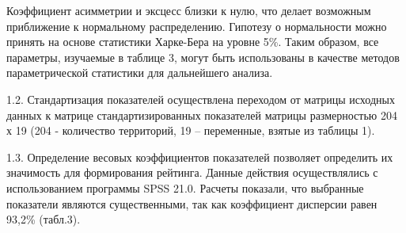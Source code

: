
\begin{multicols}{2}
Коэффициент асимметрии и эксцесс близки к нулю, что делает возможным
приближение к нормальному распределению. Гипотезу о нормальности можно
принять на основе статистики Харке-Бера на уровне 5\%. Таким образом,
все параметры, изучаемые в таблице 3, могут быть использованы в качестве
методов параметрической статистики для дальнейшего анализа.

1.2. Стандартизация показателей осуществлена переходом от матрицы
исходных данных к матрице стандартизированных показателей матрицы
размерностью 204 х 19 (204 - количество территорий, 19 -- переменные,
взятые из таблицы 1).

1.3. Определение весовых коэффициентов показателей позволяет определить
их значимость для формирования рейтинга. Данные действия осуществлялись
с использованием программы SPSS 21.0. Расчеты показали, что выбранные
показатели являются существенными, так как коэффициент дисперсии равен
93,2\% (табл.3).
\end{multicols}

